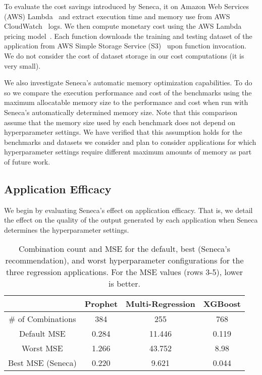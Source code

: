 To evaluate the cost savings introduced by Seneca,
it on Amazon Web Services (AWS) Lambda~\cite{ref:awslambda} and extract
execution time and memory use from AWS CloudWatch~\cite{ref:awscloudwatch} logs.  
We then compute monetary cost
using the AWS Lambda pricing model~\cite{ref:pricing}.
Each function downloads the training and testing dataset 
of the application from AWS Simple Storage Service (S3)~\cite{ref:awss3} upon function invocation. 
We do not consider the cost of dataset storage in our cost computations (it is very small).

We also investigate Seneca's automatic memory optimization capabilities.  To
do so we compare the execution performance and cost of the benchmarks using
the maximum allocatable memory size to the performance and cost when run with
Seneca's automatically determined memory size.  Note that this comparison
assume that the memory size used by each benchmark does not depend on
hyperparameter settings.  We have verified that this assumption holds for the
benchmarks and datasets we consider and plan to consider applications for
which hyperparameter settings require different maximum amounts of memory as
part of future work.  

\subsection{Application Efficacy}

We begin by evaluating Seneca's effect on application efficacy.
That is, we detail the effect on the quality of the output generated by each
application when Seneca determines the hyperparameter settings. 

\begin{table}
\centering
\begin{tabular}{|c|c|c|c|}
\hline
& Prophet & Multi-Regression & XGBoost\\
\hline
\# of Combinations & 384 & 255 & 768\\
\hline
\hline
Default MSE & 0.284 & 11.446 & 0.119 \\
\hline
Worst MSE & 1.266 & 43.752 & 8.98 \\
\hline
Best MSE (Seneca) & 0.220 & 9.621 & 0.044 \\
\hline
\end{tabular}
\caption{Combination count and MSE for the default, best (Seneca's recommendation), and worst hyperparameter configurations for the three regression applications. 
For the MSE  values (rows 3-5), lower is better.
\label{tab:mse}}
\end{table}

